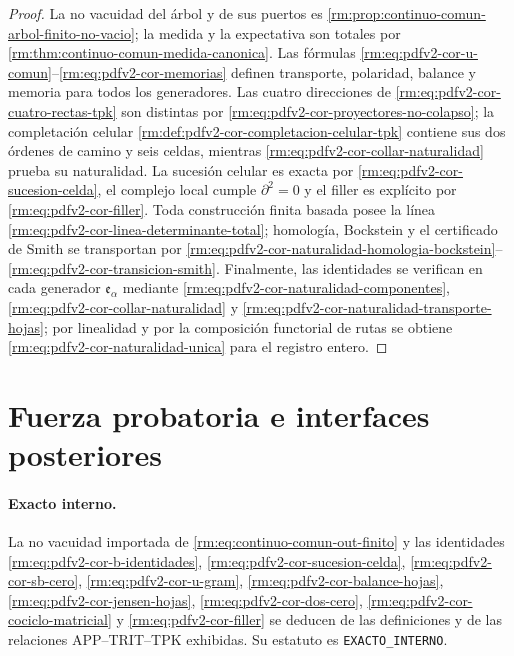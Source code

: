 \begin{proof}
La no vacuidad del árbol y de sus puertos es
\cref{rm:prop:continuo-comun-arbol-finito-no-vacio}; la medida y la expectativa
son totales por \cref{rm:thm:continuo-comun-medida-canonica}. Las fórmulas
  \eqref{rm:eq:pdfv2-cor-u-comun}--\eqref{rm:eq:pdfv2-cor-memorias} definen transporte,
polaridad, balance y memoria para todos los generadores. Las cuatro
  direcciones de \eqref{rm:eq:pdfv2-cor-cuatro-rectas-tpk} son distintas por
  \eqref{rm:eq:pdfv2-cor-proyectores-no-colapso}; la completación celular
  \cref{rm:def:pdfv2-cor-completacion-celular-tpk} contiene sus dos órdenes de
  camino y seis celdas, mientras
  \eqref{rm:eq:pdfv2-cor-collar-naturalidad} prueba su naturalidad. La
sucesión celular es exacta por \eqref{rm:eq:pdfv2-cor-sucesion-celda}, el
complejo local cumple \(\partial^2=0\) y el filler es explícito por
\eqref{rm:eq:pdfv2-cor-filler}. Toda construcción finita basada posee la línea
\eqref{rm:eq:pdfv2-cor-linea-determinante-total}; homología, Bockstein y el
certificado de Smith se transportan por
\eqref{rm:eq:pdfv2-cor-naturalidad-homologia-bockstein}--
\eqref{rm:eq:pdfv2-cor-transicion-smith}. Finalmente, las identidades se
verifican en cada generador \(\mathfrak e_\alpha\) mediante
\eqref{rm:eq:pdfv2-cor-naturalidad-componentes},
\eqref{rm:eq:pdfv2-cor-collar-naturalidad} y
\eqref{rm:eq:pdfv2-cor-naturalidad-transporte-hojas}; por linealidad y por la
composición functorial de rutas se obtiene
\eqref{rm:eq:pdfv2-cor-naturalidad-unica} para el registro entero.
\end{proof}

\section{Fuerza probatoria e interfaces posteriores}

\paragraph{Exacto interno.}
La no vacuidad importada de \eqref{rm:eq:continuo-comun-out-finito} y las
identidades
\eqref{rm:eq:pdfv2-cor-b-identidades},
\eqref{rm:eq:pdfv2-cor-sucesion-celda},
\eqref{rm:eq:pdfv2-cor-sb-cero},
\eqref{rm:eq:pdfv2-cor-u-gram},
\eqref{rm:eq:pdfv2-cor-balance-hojas},
\eqref{rm:eq:pdfv2-cor-jensen-hojas},
\eqref{rm:eq:pdfv2-cor-dos-cero},
\eqref{rm:eq:pdfv2-cor-cociclo-matricial} y
\eqref{rm:eq:pdfv2-cor-filler} se deducen de las definiciones y de las relaciones
APP--TRIT--TPK exhibidas. Su estatuto es
\texttt{EXACTO\_INTERNO}.

